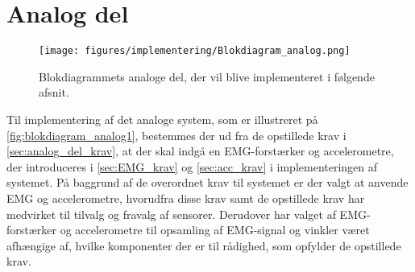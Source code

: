 \section{Analog del}
\begin{figure}[H]
\centering
\texttt{[image: figures/implementering/Blokdiagram\_analog.png]}
\caption{Blokdiagrammets analoge del, der vil blive implementeret i følgende afsnit.}
\label{fig:blokdiagram_analog1}
\end{figure}

\noindent
Til implementering af det analoge system, som er illustreret på \autoref{fig:blokdiagram_analog1}, bestemmes der ud fra de opstillede krav i \autoref{sec:analog_del_krav}, at der skal indgå en EMG-forstærker og accelerometre, der introduceres i \autoref{sec:EMG_krav} og \autoref{sec:acc_krav} i implementeringen af systemet. På baggrund af de overordnet krav til systemet er der valgt at anvende EMG og accelerometre, hvorudfra disse krav samt de opstillede krav har medvirket til tilvalg og fravalg af sensorer. Derudover har valget af EMG-forstærker og accelerometre til opsamling af EMG-signal og vinkler været afhængige af, hvilke komponenter der er til rådighed, som opfylder de opstillede krav. 




